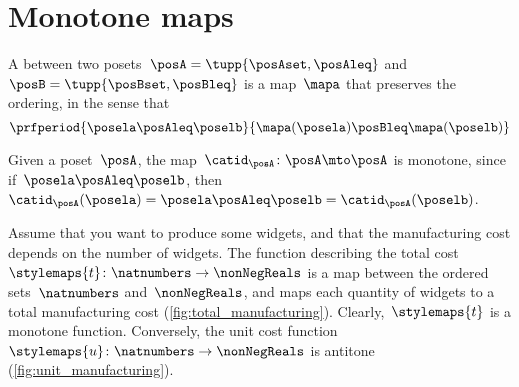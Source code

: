 
\section{Monotone maps}

\label{sec:monotonicity-monotone-maps}



\begin{definition}
    \label{def:monotone}
    A \emph{} between two posets~$\posA=\tupp{\posAset, \posAleq}$ and~$\posB=\tupp{\posBset, \posBleq}$ is a map~$\mapa$ that preserves the ordering, in the sense that
    \begin{equation}
        \prfperiod{
            \posela \posAleq \poselb
        }{
            \mapa(\posela) \posBleq \mapa(\poselb)
        }
    \end{equation}
\end{definition}

\begin{remark}
    Given a poset~$\posA$, the map~$\catid_{\posA}\colon \posA \mto \posA$ is monotone, since if~$\posela\posAleq \poselb$, then~$\catid_{\posA}(\posela)=\posela \posAleq  \poselb =  \catid_{\posA}(\poselb )$.
\end{remark}

\begin{example}
    Assume that you want to produce some widgets, and that the manufacturing cost depends on the number of widgets.
    The function describing the total cost~$\stylemaps{t}\colon \natnumbers\to \nonNegReals$ is a map between the ordered sets~$\natnumbers$ and~$\nonNegReals$, and maps each quantity of widgets to a total manufacturing cost (\cref{fig:total_manufacturing}).
    Clearly,~$\stylemaps{t}$ is a monotone function.
    Conversely, the unit cost function~$\stylemaps{u}\colon \natnumbers\to \nonNegReals$ is antitone (\cref{fig:unit_manufacturing}).
\end{example}

